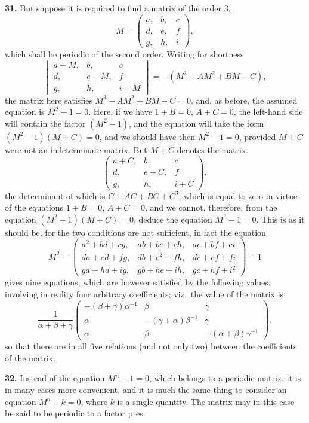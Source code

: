 \documentclass[12pt,a4paper]{article}
\theoremstyle{definition}
\begin{document}
\medskip
\noindent\textbf{31.} But suppose it is required to find a matrix of the order 3,
\[
M = \begin{pmatrix} a, & b, & c \\ d, & e, & f \\ g, & h, & i \end{pmatrix},
\]
which shall be periodic of the second order. Writing for shortness
\[
\begin{vmatrix} a-M, & b, & c \\ d, & e-M, & f \\ g, & h, & i-M \end{vmatrix}
= -(M^3 - AM^2 + BM - C),
\]
the matrix here satisfies $M^3 - AM^2 + BM - C = 0$, and, as before, the assumed equation is $M^2 - 1 = 0$. Here, if we have $1+B=0$, $A+C=0$, the left-hand side will contain the factor $(M^2-1)$, and the equation will take the form $(M^2-1)(M+C)=0$, and we should have then $M^2-1=0$, provided $M+C$ were not an indeterminate matrix. But $M+C$ denotes the matrix
\[
\begin{pmatrix} a+C, & b, & c \\ d, & e+C, & f \\ g, & h, & i+C \end{pmatrix},
\]
the determinant of which is $C+AC+BC+C^3$, which is equal to zero in virtue of the equations $1+B=0$, $A+C=0$, and we cannot, therefore, from the equation $(M^2-1)(M+C)=0$, deduce the equation $M^2-1=0$. This is as it should be, for the two conditions are not sufficient, in fact the equation
\[
M^2 = \begin{pmatrix}
a^2+bd+cg, & ab+be+ch, & ac+bf+ci \\
da+ed+fg, & db+e^2+fh, & dc+ef+fi \\
ga+hd+ig, & gb+he+ih, & gc+hf+i^2
\end{pmatrix} = 1
\]
gives nine equations, which are however satisfied by the following values, involving in reality four arbitrary coefficients; viz.\ the value of the matrix is
\[
\frac{1}{\alpha+\beta+\gamma}
\begin{pmatrix}
-(\beta+\gamma)\alpha^{-1} & \beta & \gamma \\
\alpha & -(\gamma+\alpha)\beta^{-1} & \gamma \\
\alpha & \beta & -(\alpha+\beta)\gamma^{-1}
\end{pmatrix},
\]
so that there are in all five relations (and not only two) between the coefficients of the matrix.

\medskip
\noindent\textbf{32.} Instead of the equation $M^n-1=0$, which belongs to a periodic matrix, it is in many cases more convenient, and it is much the same thing to consider an equation $M^n-k=0$, where $k$ is a single quantity. The matrix may in this case be said to be periodic to a factor pres.
\end{document}
